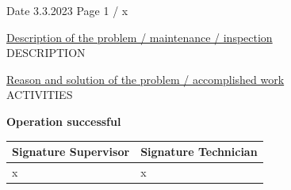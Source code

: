 \documentclass[openany, 10pt]{article}
\begin{document}
    \begin{flushright}
        Date 3.3.2023 \hspace{1cm} Page 1 / x
    \end{flushright}

    \underline{Description of the problem / maintenance / inspection} \\

    {{ DESCRIPTION }}

    \vspace{1cm}
    
    \underline{Reason and solution of the problem / accomplished work} \\

{{ ACTIVITIES }}

    \vspace{0.5cm}

    \textbf{Operation successful}  \\

    \begin{tabular}[H]{p{0.5\linewidth} p{0.5\linewidth}}
        \textbf{Signature Supervisor} & \textbf{Signature Technician} \\
        \hline
        \vspace{1cm} x & \vspace{1cm} x \\
    \end{tabular}
\end{document}
